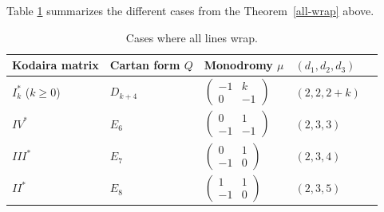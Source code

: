 \documentclass[pdftex]{sigma}
\numberwithin{equation}{section}
\numberwithin{figure}{section}
\numberwithin{table}{section}
\theoremstyle{definition}
\begin{document}
Table \ref{wraptable} summarizes the different cases from the Theorem~\ref{all-wrap} above.

\begin{table}[h] \centering
 \begin{tabular}{ | l | l | l | l | l |}
 \hline
 Kodaira matrix & Cartan form $Q$ & Monodromy $\mu$ & $(d_1,d_2,d_3)$ \\ \hline
 $I^*_{k}$ ($k\geq 0$) & $D_{k+4}$ & 	 $\left(\begin{matrix}
		-1 &k \\
	 0 &-1
		\end{matrix}\right)$				& $(2,2,2+k)$ 	 \\ \hline
 $IV^*$ & $E_6$ & 		$\left(\begin{matrix}
		0 &1 \\
	 -1 &-1
		\end{matrix}\right)$		 & $(2,3,3)$	 \\ \hline
 $III^*$ &$E_7$ &	$\left(\begin{matrix}
		0 &1 \\
	 -1 &0
		\end{matrix}\right)$	 	 & $(2,3,4)$	 \\ \hline
 $II^*$ &$E_8$ & 	$\left(\begin{matrix}
		1 &1 \\
	 -1 &0
		\end{matrix}\right)$				& $(2,3,5)$		 \\ \hline
 \end{tabular}\caption{Cases where all lines wrap.}\label{wraptable}
 \end{table}
\end{document}
